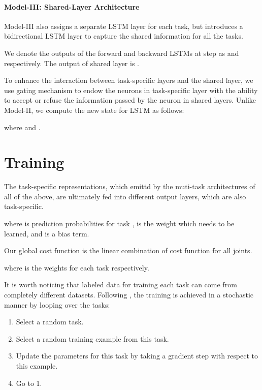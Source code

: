 \documentclass{article}
\begin{document}
\paragraph{Model-III: Shared-Layer Architecture}

Model-III also assigns a separate LSTM layer for each task, but introduces a bidirectional LSTM layer to capture the shared information for all the tasks.

We denote the outputs of the forward and backward LSTMs at step  as  and   respectively. The output of shared layer is .

To enhance the interaction between task-specific layers and the shared layer, we use gating mechanism to endow the neurons in task-specific layer with the ability to accept or refuse the information passed by the neuron in shared layers.
Unlike Model-II, we compute the new state for LSTM as follows:

where  and .



\section{Training}

The  task-specific representations, which emittd by the muti-task architectures of all of the above, are ultimately fed into different output layers, which are also task-specific.

where  is prediction probabilities for task ,  is the weight which needs to be learned, and  is a bias term.

Our global cost function is the linear combination of cost function for all joints.

where  is the weights for each task  respectively.

It is worth noticing that labeled data for training each task can come from completely different datasets. Following \cite{collobert2008unified}, the training is achieved in a stochastic manner by looping over the tasks:
\begin{enumerate}
  \item Select a random task.
  \item Select a random training example from this task.
  \item Update the parameters for this task by taking a gradient step with respect to this example.
  \item Go to 1.
\end{enumerate}

\vspace{-1em}
\end{document}
